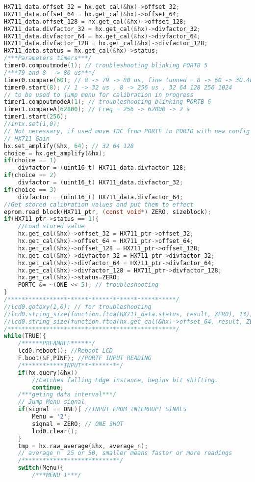 \begin{lstlisting}[language=C, caption={main.c}, label=main-c, captionpos=b]
HX711_data.offset_32 = hx.get_cal(&hx)->offset_32;
HX711_data.offset_64 = hx.get_cal(&hx)->offset_64;
HX711_data.offset_128 = hx.get_cal(&hx)->offset_128;
HX711_data.divfactor_32 = hx.get_cal(&hx)->divfactor_32;
HX711_data.divfactor_64 = hx.get_cal(&hx)->divfactor_64;
HX711_data.divfactor_128 = hx.get_cal(&hx)->divfactor_128;
HX711_data.status = hx.get_cal(&hx)->status;
/***Parameters timers***/
timer0.compoutmode(1); // troubleshooting blinking PORTB 5
/***79 and 8  -> 80 us***/
timer0.compare(60); // 8 -> 79 -> 80 us, fine tunned = 8 -> 60 -> 30.4us
timer0.start(8); // 1 -> 32 us , 8 -> 256 us , 32 64 128 256 1024
// to be used to jump menu for calibration in progress
timer1.compoutmodeA(1); // troubleshooting blinking PORTB 6
timer1.compareA(62800); // Freq = 256 -> 62800 -> 2 s
timer1.start(256);
//intx.set(1,0);
// Not necessary, if used move IDC from PORTF to PORTD with new config pinage.
// HX711 Gain
hx.set_amplify(&hx, 64); // 32 64 128
choice = hx.get_amplify(&hx);
if(choice == 1)
	divfactor = (uint16_t) HX711_data.divfactor_128;
if(choice == 2)
	divfactor = (uint16_t) HX711_data.divfactor_32;
if(choice == 3)
	divfactor = (uint16_t) HX711_data.divfactor_64;
//Get stored calibration values and put them to effect
eprom.read_block(HX711_ptr, (const void*) ZERO, sizeblock);
if(HX711_ptr->status == 1){
	//Load stored value 
	hx.get_cal(&hx)->offset_32 = HX711_ptr->offset_32;
	hx.get_cal(&hx)->offset_64 = HX711_ptr->offset_64;
	hx.get_cal(&hx)->offset_128 = HX711_ptr->offset_128;
	hx.get_cal(&hx)->divfactor_32 = HX711_ptr->divfactor_32;
	hx.get_cal(&hx)->divfactor_64 = HX711_ptr->divfactor_64;
	hx.get_cal(&hx)->divfactor_128 = HX711_ptr->divfactor_128;
	hx.get_cal(&hx)->status=ZERO;
	PORTC &= ~(ONE << 5); // troubleshooting
}
/************************************************/
//lcd0.gotoxy(1,0); // for troubleshooting
//lcd0.string_size(function.ftoa(HX711_data.status, result, ZERO), 13);
//lcd0.string_size(function.ftoa(hx.get_cal(&hx)->offset_64, result, ZERO), 13);
/************************************************/
while(TRUE){
	/******PREAMBLE******/
	lcd0.reboot(); //Reboot LCD
	F.boot(&F,PINF); //PORTF INPUT READING
	/************INPUT***********/
	if(hx.query(&hx)) 
		//Catches falling Edge instance, begins bit shifting.
		continue;
	/***geting data interval***/
	// Jump Menu signal
	if(signal == ONE){ //INPUT FROM INTERRUPT SINALS
		Menu = '2';
		signal = ZERO; // ONE SHOT
		lcd0.clear();
	}
	tmp = hx.raw_average(&hx, average_n); 
	// average_n  25 or 50, smaller means faster or more readings
	/****************************/
	switch(Menu){
		/***MENU 1***/

\end{lstlisting}
